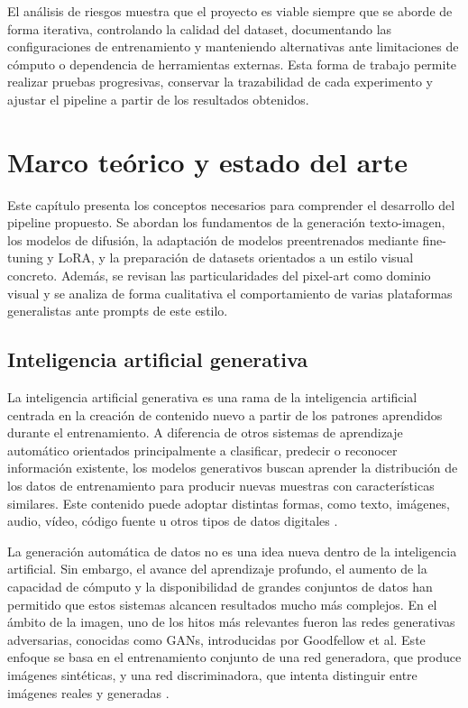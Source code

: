 \documentclass[a4paper,11pt,titlepage]{scrbook}
\begin{document}
El análisis de riesgos muestra que el proyecto es viable siempre que se aborde de forma iterativa, controlando la calidad del dataset, documentando las configuraciones de entrenamiento y manteniendo alternativas ante limitaciones de cómputo o dependencia de herramientas externas. Esta forma de trabajo permite realizar pruebas progresivas, conservar la trazabilidad de cada experimento y ajustar el pipeline a partir de los resultados obtenidos.



\chapter{Marco teórico y estado del arte} \label{marcoteorico}

Este capítulo presenta los conceptos necesarios para comprender el desarrollo del pipeline propuesto. Se abordan los fundamentos de la generación texto-imagen, los modelos de difusión, la adaptación de modelos preentrenados mediante fine-tuning y LoRA, y la preparación de datasets orientados a un estilo visual concreto. Además, se revisan las particularidades del pixel-art como dominio visual y se analiza de forma cualitativa el comportamiento de varias plataformas generalistas ante prompts de este estilo.

\section{Inteligencia artificial generativa}

La inteligencia artificial generativa es una rama de la inteligencia artificial centrada en la creación de contenido nuevo a partir de los patrones aprendidos durante el entrenamiento. A diferencia de otros sistemas de aprendizaje automático orientados principalmente a clasificar, predecir o reconocer información existente, los modelos generativos buscan aprender la distribución de los datos de entrenamiento para producir nuevas muestras con características similares. Este contenido puede adoptar distintas formas, como texto, imágenes, audio, vídeo, código fuente u otros tipos de datos digitales \cite{feuerriegel2024generative}.

\medskip

La generación automática de datos no es una idea nueva dentro de la inteligencia artificial. Sin embargo, el avance del aprendizaje profundo, el aumento de la capacidad de cómputo y la disponibilidad de grandes conjuntos de datos han permitido que estos sistemas alcancen resultados mucho más complejos. En el ámbito de la imagen, uno de los hitos más relevantes fueron las redes generativas adversarias, conocidas como GANs, introducidas por Goodfellow et al. Este enfoque se basa en el entrenamiento conjunto de una red generadora, que produce imágenes sintéticas, y una red discriminadora, que intenta distinguir entre imágenes reales y generadas \cite{goodfellow2014generative}.
\end{document}
